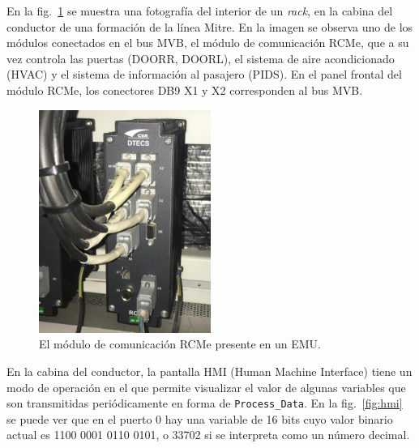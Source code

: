 En la fig.~\ref{fig:rcme} se muestra una fotografía del interior de un \textit{rack}, en la cabina del conductor de una formación de la línea Mitre. En la imagen se observa uno de los módulos conectados en el bus MVB, el módulo de comunicación RCMe, que a su vez controla las puertas (DOORR, DOORL), el sistema de aire acondicionado (HVAC) y el sistema de información al pasajero (PIDS). En el panel frontal del módulo RCMe, los conectores DB9 X1 y X2 corresponden al bus MVB.

\begin{figure}[htbp]
	\centering
	\includegraphics[width=0.5\textwidth]{./Figures/RCMe.jpeg}
	\caption[El módulo de comunicación RCMe]{El módulo de comunicación RCMe presente en un EMU.
        \\ }
    \label{fig:rcme}
\end{figure}

En la cabina del conductor, la pantalla HMI (Human Machine Interface) tiene un modo de operación en el que permite visualizar el valor de algunas variables que son transmitidas periódicamente en forma de \texttt{Process\_Data}. En la fig.~\ref{fig:hmi} se puede ver que en el puerto 0 hay una variable de 16 bits cuyo valor binario actual es 1100 0001 0110 0101, o 33702 si se interpreta como un número decimal.

